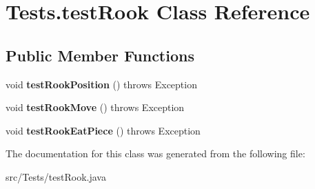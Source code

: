 \hypertarget{class_tests_1_1test_rook}{}\section{Tests.\+test\+Rook Class Reference}
\label{class_tests_1_1test_rook}
\subsection*{Public Member Functions}
\begin{DoxyCompactItemize}
\item 
\mbox{\label{class_tests_1_1test_rook_a76994b4151a8f1ee3ce1ee9072104987}} 
void {\bfseries test\+Rook\+Position} ()  throws Exception
\item 
\mbox{\label{class_tests_1_1test_rook_a2d0d83089e8f7982a3c1a21e3e3b68ed}} 
void {\bfseries test\+Rook\+Move} ()  throws Exception
\item 
\mbox{\label{class_tests_1_1test_rook_ac47ba5391cb7d8e8e28f0d44d1989cc8}} 
void {\bfseries test\+Rook\+Eat\+Piece} ()  throws Exception
\end{DoxyCompactItemize}


The documentation for this class was generated from the following file\+:\begin{DoxyCompactItemize}
\item 
src/\+Tests/test\+Rook.\+java\end{DoxyCompactItemize}
